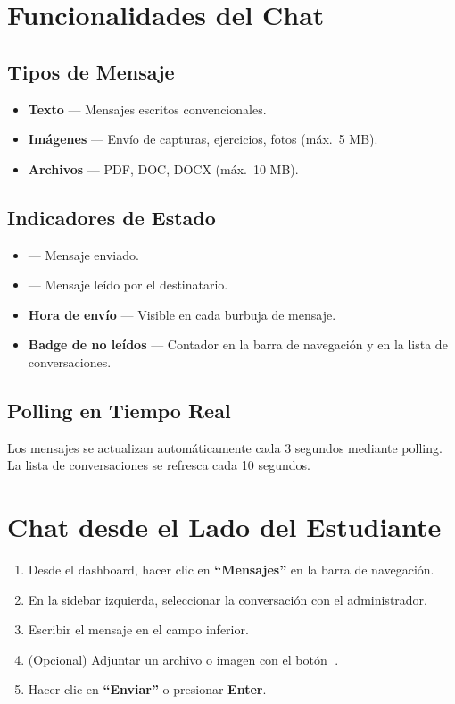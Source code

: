 \documentclass[12pt, a4paper, oneside]{book}
\begin{document}
\section{Funcionalidades del Chat}

\subsection{Tipos de Mensaje}

\begin{itemize}
    \item \textbf{Texto} — Mensajes escritos convencionales.
    \item \textbf{Imágenes} — Envío de capturas, ejercicios, fotos (máx.\ 5 MB).
    \item \textbf{Archivos} — PDF, DOC, DOCX (máx.\ 10 MB).
\end{itemize}

\subsection{Indicadores de Estado}

\begin{itemize}
    \item \textbf{} — Mensaje enviado.
    \item \textbf{} — Mensaje leído por el destinatario.
    \item \textbf{Hora de envío} — Visible en cada burbuja de mensaje.
    \item \textbf{Badge de no leídos} — Contador en la barra de navegación y en la lista de conversaciones.
\end{itemize}

\subsection{Polling en Tiempo Real}

Los mensajes se actualizan automáticamente cada 3 segundos mediante polling. La lista de conversaciones se refresca cada 10 segundos.

\section{Chat desde el Lado del Estudiante}

\begin{stepbox}[title={Enviar un mensaje al administrador}]
\begin{enumerate}
    \item Desde el dashboard, hacer clic en \textbf{``Mensajes''} en la barra de navegación.
    \item En la sidebar izquierda, seleccionar la conversación con el administrador.
    \item Escribir el mensaje en el campo inferior.
    \item (Opcional) Adjuntar un archivo o imagen con el botón 📎.
    \item Hacer clic en \textbf{``Enviar''} o presionar \textbf{Enter}.
\end{enumerate}
\end{stepbox}
\end{document}
